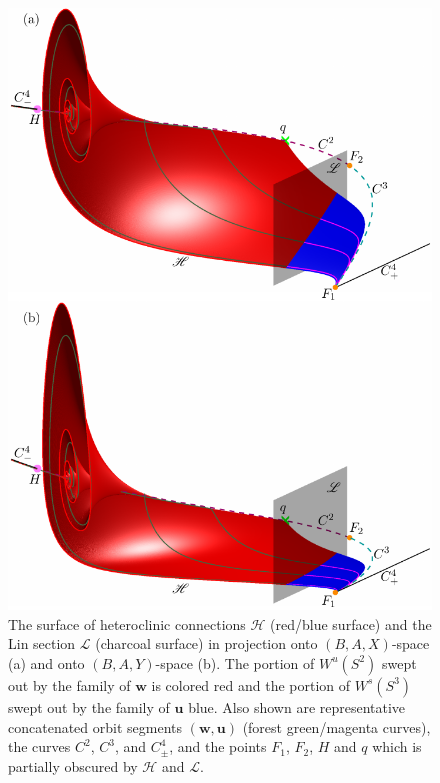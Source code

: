 \documentclass{ws-ijbc}
\begin{document}
\begin{figure}[t!]
\centering
\includegraphics[]{./figures/MKMO_11.pdf}
\caption{The surface of heteroclinic connections $\mathscr{H}$ (red/blue surface) and the Lin section $\mathscr{L}$ (charcoal surface) in projection onto $(B,A,X)$-space (a) and onto $(B,A,Y)$-space (b).  The portion of $W^u(S^2)$ swept out by the family of $\mathbf{w}$ is colored red and the portion of $W^s(S^3)$ swept out by the family of $\mathbf{u}$ blue.  Also shown are representative concatenated orbit segments $(\mathbf{w},\mathbf{u})$ (forest green/magenta curves), the curves $C^2$, $C^3$, and $C^4_\pm$, and the points $F_1$, $F_2$, $H$ and $q$ which is partially obscured by $\mathscr{H}$ and $\mathscr{L}$.}
\label{figure_11}
\end{figure}
\end{document}
